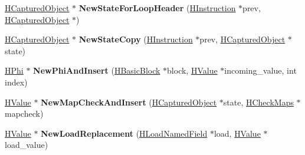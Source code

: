 \begin{DoxyCompactItemize}
\item 
\hyperlink{classv8_1_1internal_1_1_h_captured_object}{H\+Captured\+Object} $\ast$ {\bfseries New\+State\+For\+Loop\+Header} (\hyperlink{classv8_1_1internal_1_1_h_instruction}{H\+Instruction} $\ast$prev, \hyperlink{classv8_1_1internal_1_1_h_captured_object}{H\+Captured\+Object} $\ast$)\hypertarget{classv8_1_1internal_1_1_h_escape_analysis_phase_a6bc39e2c6556caa3b484d2041cc0844b}{}\label{classv8_1_1internal_1_1_h_escape_analysis_phase_a6bc39e2c6556caa3b484d2041cc0844b}

\item 
\hyperlink{classv8_1_1internal_1_1_h_captured_object}{H\+Captured\+Object} $\ast$ {\bfseries New\+State\+Copy} (\hyperlink{classv8_1_1internal_1_1_h_instruction}{H\+Instruction} $\ast$prev, \hyperlink{classv8_1_1internal_1_1_h_captured_object}{H\+Captured\+Object} $\ast$state)\hypertarget{classv8_1_1internal_1_1_h_escape_analysis_phase_ad3236dc975c91ac19a558af4cffae834}{}\label{classv8_1_1internal_1_1_h_escape_analysis_phase_ad3236dc975c91ac19a558af4cffae834}

\item 
\hyperlink{classv8_1_1internal_1_1_h_phi}{H\+Phi} $\ast$ {\bfseries New\+Phi\+And\+Insert} (\hyperlink{classv8_1_1internal_1_1_h_basic_block}{H\+Basic\+Block} $\ast$block, \hyperlink{classv8_1_1internal_1_1_h_value}{H\+Value} $\ast$incoming\+\_\+value, int index)\hypertarget{classv8_1_1internal_1_1_h_escape_analysis_phase_a19f9487ada862ec23e8e7f9a8272a65a}{}\label{classv8_1_1internal_1_1_h_escape_analysis_phase_a19f9487ada862ec23e8e7f9a8272a65a}

\item 
\hyperlink{classv8_1_1internal_1_1_h_value}{H\+Value} $\ast$ {\bfseries New\+Map\+Check\+And\+Insert} (\hyperlink{classv8_1_1internal_1_1_h_captured_object}{H\+Captured\+Object} $\ast$state, \hyperlink{classv8_1_1internal_1_1_h_check_maps}{H\+Check\+Maps} $\ast$mapcheck)\hypertarget{classv8_1_1internal_1_1_h_escape_analysis_phase_a149ac52efade6e5d1dd65a915fe85e3f}{}\label{classv8_1_1internal_1_1_h_escape_analysis_phase_a149ac52efade6e5d1dd65a915fe85e3f}

\item 
\hyperlink{classv8_1_1internal_1_1_h_value}{H\+Value} $\ast$ {\bfseries New\+Load\+Replacement} (\hyperlink{classv8_1_1internal_1_1_h_load_named_field}{H\+Load\+Named\+Field} $\ast$load, \hyperlink{classv8_1_1internal_1_1_h_value}{H\+Value} $\ast$load\+\_\+value)\hypertarget{classv8_1_1internal_1_1_h_escape_analysis_phase_a4283f8b5009f74443e11c24422601501}{}\label{classv8_1_1internal_1_1_h_escape_analysis_phase_a4283f8b5009f74443e11c24422601501}


\end{DoxyCompactItemize}
